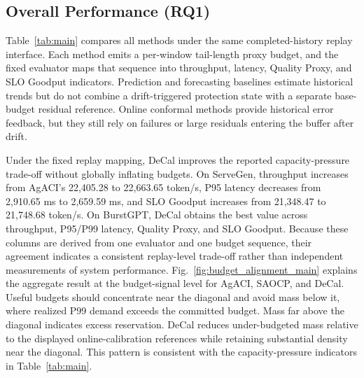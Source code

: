 \documentclass[sigplan,10pt, anonymous]{acmart}
\begin{document}
\subsection{Overall Performance (RQ1)}
\label{sec:overall-performance}

Table~\ref{tab:main} compares all methods under the same completed-history replay interface. Each method emits a per-window tail-length proxy budget, and the fixed evaluator maps that sequence into throughput, latency, Quality Proxy, and SLO Goodput indicators. Prediction and forecasting baselines estimate historical trends but do not combine a drift-triggered protection state with a separate base-budget residual reference. Online conformal methods provide historical error feedback, but they still rely on failures or large residuals entering the buffer after drift.

Under the fixed replay mapping, DeCal improves the reported capacity-pressure trade-off without globally inflating budgets. On ServeGen, throughput increases from AgACI's 22,405.28 to 22,663.65 token/s, P95 latency decreases from 2,910.65 ms to 2,659.59 ms, and SLO Goodput increases from 21,348.47 to 21,748.68 token/s. On BurstGPT, DeCal obtains the best value across throughput, P95/P99 latency, Quality Proxy, and SLO Goodput. Because these columns are derived from one evaluator and one budget sequence, their agreement indicates a consistent replay-level trade-off rather than independent measurements of system performance.
Fig.~\ref{fig:budget_alignment_main} explains the aggregate result at the budget-signal level for AgACI, SAOCP, and DeCal. Useful budgets should concentrate near the diagonal and avoid mass below it, where realized P99 demand exceeds the committed budget. Mass far above the diagonal indicates excess reservation. DeCal reduces under-budgeted mass relative to the displayed online-calibration references while retaining substantial density near the diagonal. This pattern is consistent with the capacity-pressure indicators in Table~\ref{tab:main}.
\end{document}
